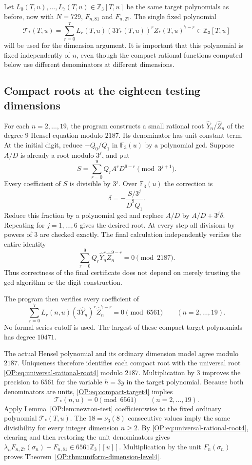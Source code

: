 \documentclass[11pt,a4paper]{article}
\theoremstyle{definition}\newtheorem{definition}[theorem]{Definition}
\theoremstyle{remark}\newtheorem{remark}[theorem]{Remark}
\numberwithin{equation}{section}
\begin{document}
Let $L_0(T,u),\ldots,L_7(T,u)\in\mathbb Z_3[T,u]$ be the same target
polynomials as before, now with $N=729$, $F_{n,81}$ and $F_{n,27}$.
The single fixed polynomial
\[
 \mathcal T_*(T,u)=
 \sum_{r=0}^7L_r(T,u)(3Y_*(T,u))^rZ_*(T,u)^{7-r}
                                  \in\mathbb Z_3[T,u]
\]
will be used for the dimension argument.  It is important that this
polynomial is fixed independently of $n$, even though the compact
rational functions computed below use different denominators at
different dimensions.

\subsection{Compact roots at the eighteen testing dimensions}
For each $n=2,\ldots,19$, the program constructs a small rational
root $\widehat Y_n/\widehat Z_n$ of the degree-$9$ Hensel equation
modulo $2187$.  Its denominator has unit constant term.
At the initial digit, reduce $-Q_0/Q_1$ in $\mathbb F_3(u)$ by a
polynomial gcd.  Suppose $A/D$ is already a root modulo $3^j$, and put
\[
 S=\sum_{r=0}^9Q_rA^rD^{9-r}\pmod{3^{j+1}}.
\]
Every coefficient of $S$ is divisible by $3^j$.  Over $\mathbb F_3(u)$
the correction is
\[
 \delta=-\frac{S/3^j}{\overline D^{9}\overline Q_1}.
\]
Reduce this fraction by a polynomial gcd and replace $A/D$ by
$A/D+3^j\delta$.  Repeating for $j=1,\ldots,6$ gives the desired root.
At every step all divisions by powers of $3$ are checked exactly.
The final calculation independently verifies the entire identity
\[
 \sum_{r=0}^9Q_r\widehat Y_n^{r}
                     \widehat Z_n^{9-r}=0\pmod{2187}.
\]
Thus correctness of the final certificate does not depend on merely
trusting the gcd algorithm or the digit construction.

The program then verifies every coefficient of
\begin{equation}\label{OP:eq:compact-target4}
 \sum_{r=0}^7L_r(n,u)(3\widehat Y_n)^r
                        \widehat Z_n^{7-r}=0\pmod{6561}
                   \qquad(n=2,\ldots,19).
\end{equation}
No formal-series cutoff is used.  The largest of these compact target
polynomials has degree $10471$.

The actual Hensel polynomial and its ordinary dimension model agree
modulo $2187$.  Uniqueness therefore identifies each compact root
with the universal root \eqref{OP:eq:universal-rational-root4} modulo
$2187$.  Multiplication by $3$ improves the precision to $6561$ for
the variable $h=3y$ in the target polynomial.  Because both
denominators are units, \eqref{OP:eq:compact-target4} implies
\[
 \mathcal T_*(n,u)=0\pmod{6561}
                       \qquad(n=2,\ldots,19).
\]
Apply Lemma~\ref{OP:lem:newton-test} coefficientwise to the fixed
ordinary polynomial $\mathcal T_*(T,u)$.  The $18=\nu_3(8)$ consecutive
values imply the same divisibility for every integer dimension
$n\geq2$.  By \eqref{OP:eq:universal-rational-root4}, clearing and then
restoring the unit denominators gives
$\lambda_nF_{n,27}(\sigma_n)-F_{n,81}\in6561\mathbb Z_3[[u]]$.
Multiplication by the unit $F_n(\sigma_n)$ proves
Theorem~\ref{OP:thm:uniform-dimension-level4}.
\end{document}
